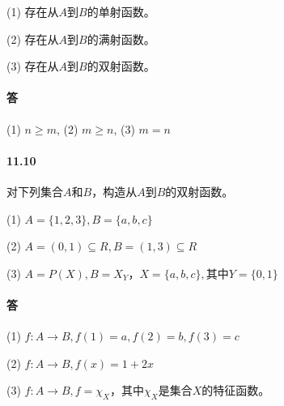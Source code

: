 \documentclass[UTF8]{ctexart}
\begin{document}
    (1) 存在从$A$到$B$的单射函数。

    (2) 存在从$A$到$B$的满射函数。

    (3) 存在从$A$到$B$的双射函数。

\paragraph{答}
    (1) $n \ge m$, (2) $m \ge n$, (3) $m=n$
    
\paragraph{11.10} \label{11.10}
    对下列集合$A$和$B$，构造从$A$到$B$的双射函数。

    (1) $A = \{ 1,2,3 \} , B = \{ a,b,c \} $

    (2) $A = (0,1)\subseteq R, B = (1,3)\subseteq R$
    
    (3) $A = P(X), B = X_Y$，$X= \{ a,b,c \} , 其中Y= \{ 0,1 \} $

\paragraph{答}
    (1) $f: A \rightarrow B, f(1) = a, f(2) = b, f(3) = c$

    (2) $f: A \rightarrow B, f(x) = 1+2x $

    (3) $f: A \rightarrow B, f = \chi_X$，其中$\chi_X$是集合$X$的特征函数。
\end{document}
